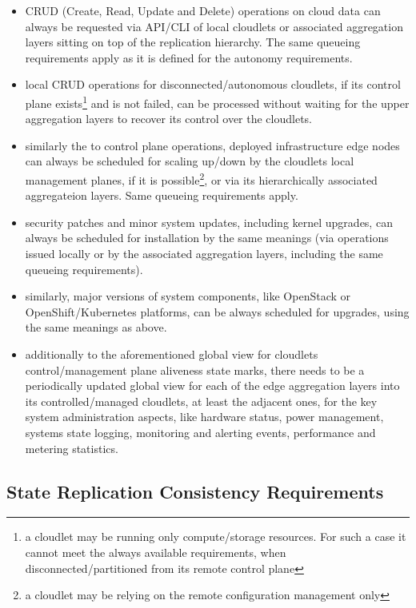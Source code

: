 \documentclass[conference]{IEEEtran}
\begin{document}
\begin{itemize}
  \item CRUD (Create, Read, Update and Delete) operations on cloud data can
    always be requested via API/CLI of local cloudlets or associated aggregation
    layers sitting on top of the replication hierarchy. The same queueing
    requirements apply as it is defined for the autonomy requirements.
  \item local CRUD operations for disconnected/autonomous cloudlets, if its
    control plane exists\footnote{a cloudlet may be running only
    compute/storage resources. For such a case it cannot meet the always
    available requirements, when disconnected/partitioned from its remote
    control plane} and is not failed, can be processed without waiting for the
    upper aggregation layers to recover its control over the cloudlets.
  \item similarly the to control plane operations, deployed infrastructure edge
    nodes can always be scheduled for scaling up/down by the cloudlets local
    management planes, if it is possible\footnote{a cloudlet may be relying on
    the remote configuration management only}, or via its hierarchically
    associated aggregateion layers. Same queueing requirements apply.
  \item security patches and minor system updates, including kernel upgrades,
    can always be scheduled for installation by the same meanings (via
    operations issued locally or by the associated aggregation layers,
    including the same queueing requirements).
  \item similarly, major versions of system components, like OpenStack or
    OpenShift/Kubernetes platforms, can be always scheduled for upgrades, using
    the same meanings as above.
  \item additionally to the aforementioned global view for cloudlets
    control/management plane aliveness state marks, there needs to be a
    periodically updated global view for each of the edge aggregation layers
    into its controlled/managed cloudlets, at least the adjacent ones, for
    the key system administration aspects, like hardware status,
    power management, systems state logging, monitoring and alerting events,
    performance and metering statistics.
\end{itemize}

\subsection{State Replication Consistency Requirements}
\end{document}
